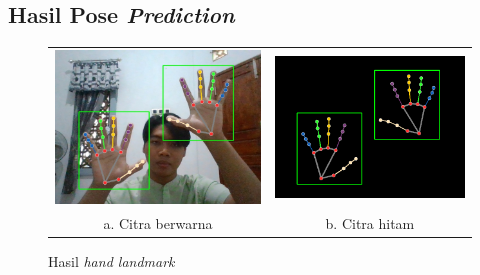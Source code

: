 \subsection{Hasil Pose \emph{Prediction}}

\begin{figure}[H]
  \centering
  \begin{tabular}{cc}
    \includegraphics[width=0.4\linewidth]{gambar/hasilposepred.jpg} & \includegraphics[width=0.4\linewidth]{gambar/hasilposepredhitam.png} \\
    a. Citra berwarna & b. Citra hitam 
    \end{tabular}
    \caption{Hasil\emph{ hand landmark}}
  \label{fig:hasilposepred}
\end{figure}

